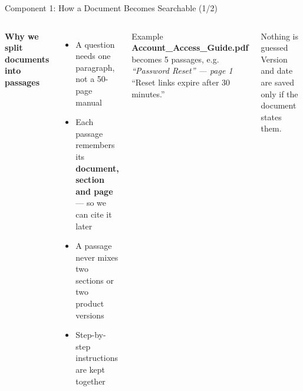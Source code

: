 \documentclass[aspectratio=169,11pt]{beamer}
\begin{document}
\begin{frame}{Component 1: How a Document Becomes Searchable \hfill{\normalsize\color{white}(1/2)}}
  \centering

  \vspace{0.6em}
  \begin{columns}[T]
      \textbf{Why we split documents into passages}
      \begin{itemize}\small
        \item A question needs one paragraph, not a 50-page manual
        \item Each passage remembers its \textbf{document, section and page} --- so we can cite it later
        \item A passage never mixes two sections or two product versions
        \item Step-by-step instructions are kept together
      \end{itemize}
      \begin{exampleblock}{Example}\small
        \textbf{Account\_Access\_Guide.pdf} becomes 5 passages, e.g.\\[0.2em]
        \textit{``Password Reset'' --- page 1}\\
        ``Reset links expire after 30 minutes.''
      \end{exampleblock}
      \begin{block}{Nothing is guessed}\small
        Version and date are saved only if the document states them.
      \end{block}
  \end{columns}
\end{frame}
\end{document}
